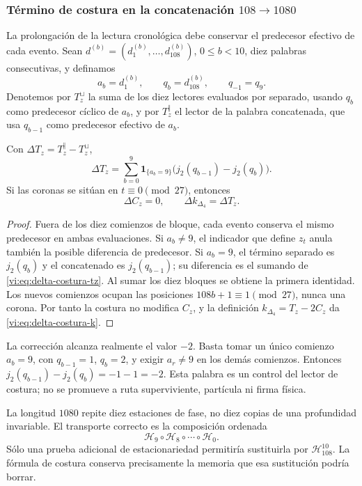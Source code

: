 \subsubsection{Término de costura en la concatenación \(108\to1080\)}
\label{vi:subsubsec:costura-108-1080}

La prolongación de la lectura cronológica debe conservar el predecesor
efectivo de cada evento. Sean
\(d^{(b)}=(d^{(b)}_1,\ldots,d^{(b)}_{108})\), \(0\le b<10\), diez
palabras consecutivas, y definamos
\[
 a_b=d^{(b)}_1,\qquad q_b=d^{(b)}_{108},\qquad q_{-1}=q_9.
\]
Denotemos por \(T_z^{\sqcup}\) la suma de los diez lectores evaluados
por separado, usando \(q_b\) como predecesor cíclico de \(a_b\), y por
\(T_z^{\Vert}\) el lector de la palabra concatenada, que usa
\(q_{b-1}\) como predecesor efectivo de \(a_b\).

\begin{lemma}
\label{vi:lem:costura-108-1080}
Con \(\Delta T_z=T_z^{\Vert}-T_z^{\sqcup}\),
\begin{equation}
 \Delta T_z=
 \sum_{b=0}^{9}\mathbf1_{\{a_b=9\}}
 \bigl(j_2(q_{b-1})-j_2(q_b)\bigr).
 \label{vi:eq:delta-costura-tz}
\end{equation}
Si las coronas se sitúan en \(t\equiv0\pmod{27}\), entonces
\begin{equation}
 \Delta C_z=0,
 \qquad
 \Delta k_{\Delta_4}=\Delta T_z.
 \label{vi:eq:delta-costura-k}
\end{equation}
\end{lemma}

\begin{proof}
Fuera de los diez comienzos de bloque, cada evento conserva el mismo
predecesor en ambas evaluaciones. Si \(a_b\ne9\), el indicador que define
\(z_t\) anula también la posible diferencia de predecesor. Si \(a_b=9\),
el término separado es \(j_2(q_b)\) y el concatenado es
\(j_2(q_{b-1})\); su diferencia es el sumando de
\eqref{vi:eq:delta-costura-tz}. Al sumar los diez bloques se obtiene la
primera identidad. Los nuevos comienzos ocupan las posiciones
\(108b+1\equiv1\pmod{27}\), nunca una corona. Por tanto la costura no
modifica \(C_z\), y la definición
\(k_{\Delta_4}=T_z-2C_z\) da
\eqref{vi:eq:delta-costura-k}.
\end{proof}

La corrección alcanza realmente el valor \(-2\). Basta tomar un único
comienzo \(a_b=9\), con \(q_{b-1}=1\), \(q_b=2\), y exigir
\(a_r\ne9\) en los demás comienzos. Entonces
\(j_2(q_{b-1})-j_2(q_b)=-1-1=-2\). Esta palabra es un control del lector
de costura; no se promueve a ruta superviviente, partícula ni firma
física.

La longitud \(1080\) repite diez estaciones de fase, no diez copias de
una profundidad invariable. El transporte correcto es la composición
ordenada
\[
 \mathcal H_9\circ\mathcal H_8\circ\cdots\circ\mathcal H_0.
\]
Sólo una prueba adicional de estacionariedad permitiría sustituirla por
\(\mathcal H_{108}^{10}\). La fórmula de costura conserva precisamente
la memoria que esa sustitución podría borrar.
